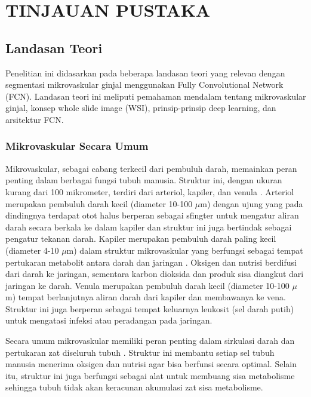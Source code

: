 \chapter{TINJAUAN PUSTAKA}


\section{Landasan Teori}
\noindent Penelitian ini didasarkan pada beberapa landasan teori yang relevan dengan segmentasi mikrovaskular ginjal menggunakan Fully Convolutional Network (FCN). Landasan teori ini meliputi pemahaman mendalam tentang mikrovaskular ginjal, konsep whole slide image (WSI), prinsip-prinsip deep learning, dan arsitektur FCN.

\subsection{Mikrovaskular Secara Umum}


\noindent Mikrovaskular, sebagai cabang terkecil dari pembuluh darah, memainkan peran penting dalam berbagai fungsi tubuh manusia. Struktur ini, dengan ukuran kurang dari 100 mikrometer, terdiri dari arteriol, kapiler, dan venula \cite{mescher_junqueiras_2021,pepe_microvascular_2023}. Arteriol merupakan pembuluh darah kecil (diameter 10-100 $\mu$m) dengan ujung yang pada dindingnya terdapat otot halus berperan sebagai sfingter untuk mengatur aliran darah secara berkala ke dalam kapiler dan struktur ini juga bertindak sebagai pengatur tekanan darah. Kapiler merupakan pembuluh darah paling kecil (diameter 4-10 $\mu$m) dalam struktur mikrovaskular yang berfungsi sebagai tempat pertukaran metabolit antara darah dan jaringan \cite{haffner_emerging_2023}. Oksigen dan nutrisi berdifusi dari darah ke jaringan, sementara karbon dioksida dan produk sisa diangkut dari jaringan ke darah. Venula merupakan pembuluh darah kecil (diameter 10-100 $\mu$m) tempat berlanjutnya aliran darah dari kapiler dan membawanya ke vena. Struktur ini juga berperan sebagai tempat keluarnya leukosit (sel darah putih) untuk mengatasi infeksi atau peradangan pada jaringan.

\noindent Secara umum mikrovaskular memiliki peran penting dalam sirkulasi darah dan pertukaran zat diseluruh tubuh \cite{rusanova_role_2022}. Struktur ini membantu setiap sel tubuh manusia menerima oksigen dan nutrisi agar bisa berfunsi secara optimal. Selain itu, struktur ini juga berfungsi sebagai alat untuk membuang sisa metabolisme sehingga tubuh tidak akan keracunan akumulasi zat sisa metabolisme.

